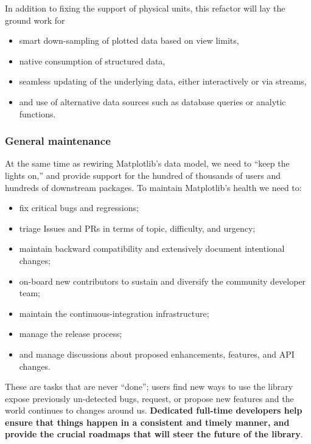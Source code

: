 \documentclass[12pt]{article}
\numberwithin{page}{section}
\begin{document}
In addition to fixing
the support of physical units, this refactor will lay the ground work for
\begin{itemize}[noitemsep]
  \item smart down-sampling of plotted data based on view limits,
  \item native consumption of structured data,
  \item seamless updating of the underlying data, either interactively
    or via streams,
  \item and use of alternative data sources such as database queries
    or analytic functions.
\end{itemize}

\subsubsection{General maintenance}

At the same time as rewiring Matplotlib's data model, we need to
``keep the lights on,'' and provide support for the hundred of
thousands of users and hundreds of downstream packages.  To maintain
Matplotlib's health we need to:
\begin{itemize}[noitemsep]
\item fix critical bugs and regressions;
\item triage Issues and PRs in terms of topic,
  difficulty, and urgency;
\item maintain backward compatibility and extensively document
  intentional changes;
\item on-board new contributors to sustain and diversify the community developer
  team;
\item maintain the continuous-integration infrastructure;
\item manage the release process;
\item and manage discussions about proposed enhancements, features,
  and API changes.
\end{itemize}
These are tasks that are never ``done''; users find new ways to use
the library expose previously un-detected bugs, request, or propose new
features and the world continues to changes around us.   \textbf{Dedicated
full-time developers help ensure that things happen in a consistent and timely manner, and provide the crucial roadmaps that will steer the future of the library}.


\end{document}
